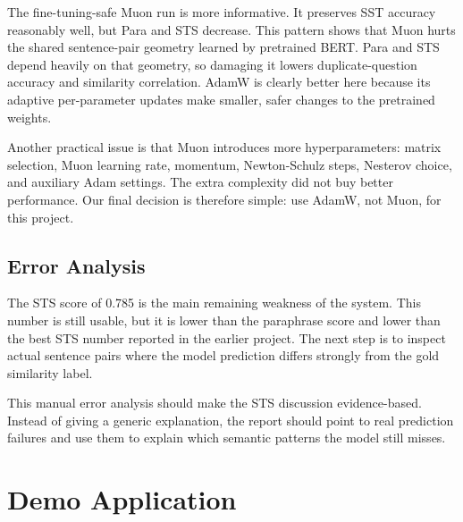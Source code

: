 \documentclass{article}
\begin{document}
The fine-tuning-safe Muon run is more informative. It preserves SST accuracy reasonably well, but Para and STS decrease. This pattern shows that Muon hurts the shared sentence-pair geometry learned by pretrained BERT. Para and STS depend heavily on that geometry, so damaging it lowers duplicate-question accuracy and similarity correlation. AdamW is clearly better here because its adaptive per-parameter updates make smaller, safer changes to the pretrained weights.

Another practical issue is that Muon introduces more hyperparameters: matrix selection, Muon learning rate, momentum, Newton-Schulz steps, Nesterov choice, and auxiliary Adam settings. The extra complexity did not buy better performance. Our final decision is therefore simple: use AdamW, not Muon, for this project.

\subsection{Error Analysis}

The STS score of 0.785 is the main remaining weakness of the system. This number is still usable, but it is lower than the paraphrase score and lower than the best STS number reported in the earlier project. The next step is to inspect actual sentence pairs where the model prediction differs strongly from the gold similarity label.

\begin{center}
\end{center}

This manual error analysis should make the STS discussion evidence-based. Instead of giving a generic explanation, the report should point to real prediction failures and use them to explain which semantic patterns the model still misses.

\section{Demo Application}
\end{document}
